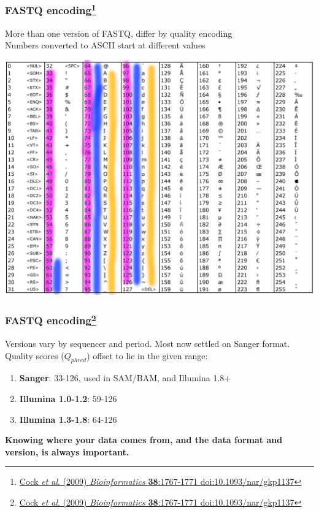 \begin{frame}[fragile]
  \frametitle{FASTQ encoding\footnote{\tiny{\href{http://dx.doi.org/10.1093/nar/gkp1137}{Cock \textit{et al}. (2009) \textit{Bioinformatics} \textbf{38}:1767-1771 doi:10.1093/nar/gkp1137}}}}
  More than one version of FASTQ, differ by quality encoding \\
  Numbers converted to ASCII start at different values
    \begin{center}
      \includegraphics[height=0.7\textheight]{images/ascii_table}
    \end{center}  
\end{frame}

\begin{frame}[fragile]
  \frametitle{FASTQ encoding\footnote{\tiny{\href{http://dx.doi.org/10.1093/nar/gkp1137}{Cock \textit{et al}. (2009) \textit{Bioinformatics} \textbf{38}:1767-1771 doi:10.1093/nar/gkp1137}}}}
  Versions vary by sequencer and period. Most now settled on Sanger format. \\
  Quality scores ($Q_{phred}$) offset to lie in the given range:
  \begin{enumerate}
    \item \textbf{Sanger}: 33-126, used in SAM/BAM, and Illumina 1.8+
    \item \textbf{Illumina 1.0-1.2}: 59-126
    \item \textbf{Illumina 1.3-1.8}: 64-126
  \end{enumerate}
  \textbf{Knowing where your data comes from, and the data format and version, is always important.}
\end{frame}

